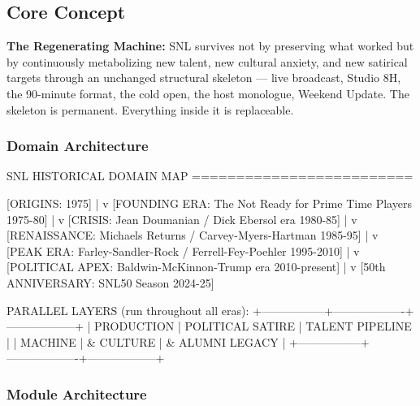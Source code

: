 \documentclass[11pt,letterpaper]{article}
\begin{document}
\subsection{Core Concept}

\begin{quotebox}
\textbf{The Regenerating Machine:} SNL survives not by preserving what worked but by continuously metabolizing new talent, new cultural anxiety, and new satirical targets through an unchanged structural skeleton --- live broadcast, Studio 8H, the 90-minute format, the cold open, the host monologue, Weekend Update. The skeleton is permanent. Everything inside it is replaceable.
\end{quotebox}

\subsubsection{Domain Architecture}

\begin{asciibox}
SNL HISTORICAL DOMAIN MAP
=========================

  [ORIGINS: 1975]
       |
       v
  [FOUNDING ERA: The Not Ready for Prime Time Players 1975-80]
       |
       v
  [CRISIS: Jean Doumanian / Dick Ebersol era 1980-85]
       |
       v
  [RENAISSANCE: Michaels Returns / Carvey-Myers-Hartman 1985-95]
       |
       v
  [PEAK ERA: Farley-Sandler-Rock / Ferrell-Fey-Poehler 1995-2010]
       |
       v
  [POLITICAL APEX: Baldwin-McKinnon-Trump era 2010-present]
       |
       v
  [50th ANNIVERSARY: SNL50 Season 2024-25]

  PARALLEL LAYERS (run throughout all eras):
  +-----------------+-------------------+------------------+
  |  PRODUCTION     |  POLITICAL SATIRE |  TALENT PIPELINE |
  |  MACHINE        |  & CULTURE        |  & ALUMNI LEGACY |
  +-----------------+-------------------+------------------+
\end{asciibox}

\subsubsection{Module Architecture}
\end{document}
